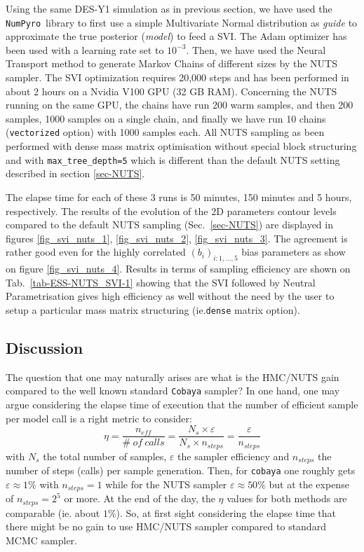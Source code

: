 \documentclass[final,5p,times,twocolumn,authoryear]{elsarticle}
\newcommand{\numpyro}{\texttt{NumPyro}}
\begin{document}
Using the same DES-Y1 simulation as in previous section, we have used the \numpyro\ library to first use a simple Multivariate Normal distribution as \textit{guide} to approximate the true posterior (\textit{model}) to feed a SVI. The Adam optimizer has been used with a learning rate set to $10^{-3}$.  Then, we have used the Neural Transport method to generate Markov Chains of different sizes by the NUTS sampler. The SVI optimization requires 20,000 steps and has been performed in about 2 hours on a Nvidia V100 GPU (32 GB RAM). Concerning the NUTS running on the same GPU, the chains have run 200 warm samples, and then 200 samples, 1000 samples on a single chain, and finally we have run 10 chains (\texttt{vectorized} option) with 1000 samples each. All NUTS sampling as been performed with dense mass matrix optimisation without special block structuring and with \texttt{max\_tree\_depth=5} which is different than the default NUTS setting described in section \ref{sec-NUTS}. 

The elapse time for each of these 3 runs is 50 minutes, 150 minutes and 5 hours, respectively. The results of the evolution of the 2D parameters contour levels compared to the default NUTS sampling (Sec.~\ref{sec-NUTS}) are displayed in figures \ref{fig_svi_nuts_1}, \ref{fig_svi_nuts_2}, \ref{fig_svi_nuts_3}. The agreement is rather good even for the highly correlated $(b_i)_{i:1,\dots,5}$ bias parameters as show on figure \ref{fig_svi_nuts_4}. Results in terms of sampling efficiency are shown on Tab.~\ref{tab-ESS-NUTS_SVI-1} showing that the SVI followed by Neutral Parametrisation gives high efficiency as well without the need by the user to setup a particular mass matrix structuring (ie.\texttt{dense} matrix option). 
%
\subsection{Discussion}
%
The question that one may naturally arises are what is the HMC/NUTS gain compared to the well known standard \texttt{Cobaya} sampler? 
In one hand, one may argue considering the elapse time of execution that the number of efficient sample per model call is a right metric to consider: 
\begin{equation}
    \eta = \frac{n_{eff}}{\#\ of\ calls} = \frac{N_s \times \varepsilon}{N_s \times n_{steps}} = \frac{\varepsilon}{n_{steps}}
\end{equation}
with $N_s$ the total number of samples, $\varepsilon$ the sampler efficiency and $n_{steps}$ the number of steps (calls) per sample generation. Then, for \texttt{cobaya} one roughly gets $\varepsilon\approx 1\%$ with $n_{steps}=1$ while for the NUTS sampler $\varepsilon\approx 50\%$ but at the expense of $n_{steps}=2^5$ or more. At the end of the day, the $\eta$ values for both methods are comparable (ie. about $1\%$). So, at first sight considering the elapse time that there might be no gain to use HMC/NUTS sampler compared to standard MCMC sampler.  
\end{document}
